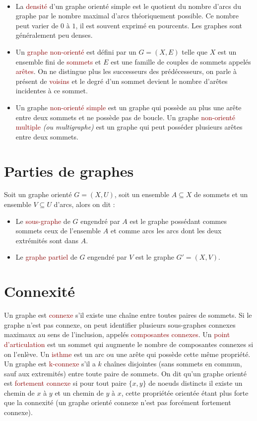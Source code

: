 \documentclass{article}
\newcommand{\red}[1]{\textcolor{darkred}{#1}}
\begin{document}
\begin{itemize}
\begin{center}
\begin{tabular}{r|l}
	\end{tabular}\\
\end{center}
$ $\\
\item La \red{densité} d'un graphe orienté simple est le quotient du nombre d'arcs du graphe par le nombre maximal d'arcs théoriquement possible. Ce nombre peut varier de $0$ 
à $1$, il est souvent exprimé en pourcents. Les graphes sont généralement peu denses.
\item Un \red{graphe non-orienté} est défini par un $G=(X,E)$ telle que $X$ est un ensemble fini de \red{sommets} et $E$ est une famille de couples de sommets appelés 
\red{arêtes}. On ne distingue plus les successeurs des prédécesseurs, on parle à présent de \red{voisins} et le degré d'un sommet devient le nombre d'arêtes incidentes à ce sommet.
\item Un graphe \red{non-orienté simple} est un graphe qui possède au plus une arête entre deux sommets et ne possède pas de boucle. Un graphe \red{non-orienté multiple} 
\textit{(ou multigraphe)} est un graphe qui peut posséder plusieurs arêtes entre deux sommets.  
\end{itemize}

\section{Parties de graphes}

\noindent Soit un graphe orienté $G=(X,U)$, soit un ensemble $A\subseteq X$ de sommets et un ensemble $V\subseteq U$ d'arcs, alors on dit :
\begin{itemize}
\item Le \red{sous-graphe} de $G$ engendré par $A$ est le graphe possédant commes sommets ceux de l'ensemble $A$ et comme arcs les arcs dont les deux extrémités sont 
dans $A$.
\item Le \red{graphe partiel} de $G$ engendré par $V$ est le graphe $G'=(X,V)$.
\end{itemize}

\section{Connexité}

\noindent Un graphe est \red{connexe} s'il existe une chaîne entre toutes paires de sommets. Si le graphe n'est pas connexe, on peut identifier plusieurs sous-graphes connexes 
maximaux au sens de l'inclusion, appelés \red{composantes connexes}. Un \red{point d'articulation} est un sommet qui augmente le nombre de composantes connexes si on l'enlève. 
Un \red{isthme} est un arc ou une arête qui possède cette même propriété. Un graphe est \red{k-connexe} s'il a $k$ chaînes disjointes (sans sommets en commun, sauf aux 
extremités) entre toute paire de sommets. On dit qu'un graphe orienté est \red{fortement connexe} si pour tout paire $\{x,y\}$ de noeuds distincts il existe un chemin de $x$ à 
$y$ et un chemin de $y$ à $x$, cette propriétée orientée étant plus forte que la connexité (un graphe orienté connexe n'est pas forcément fortement connexe).
\end{document}
